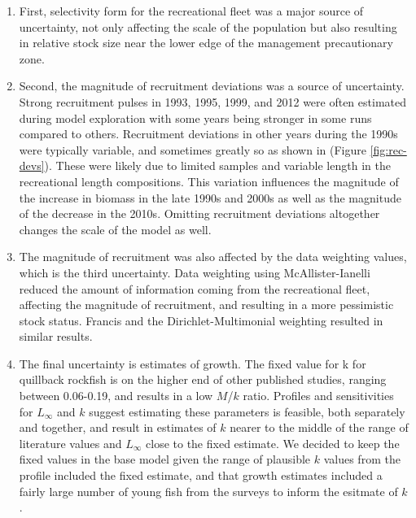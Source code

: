 \documentclass[11pt,
  english,
  a4paper,
]{article}
\begin{document}
\begin{enumerate}

  \item First, selectivity form for the recreational fleet was a major source of uncertainty, not only affecting the scale of the population but also resulting in relative stock size near the lower edge of the management precautionary zone. 
  
  \item Second, the magnitude of recruitment deviations was a source of uncertainty. Strong recruitment pulses in 1993, 1995, 1999, and 2012 were often estimated during model exploration with some years being stronger in some runs compared to others. Recruitment deviations in other years during the 1990s were typically variable, and sometimes greatly so as shown in (Figure \ref{fig:rec-devs}). These were likely due to limited samples and variable length in the recreational length compositions. This variation influences the magnitude of the increase in biomass in the late 1990s and  2000s as well as the magnitude of the decrease in the 2010s. Omitting recruitment deviations altogether changes the scale of the model as well. 
  
  \item The magnitude of recruitment was also affected by the data weighting values, which is the third uncertainty. Data weighting using McAllister-Ianelli reduced the amount of information coming from the recreational fleet, affecting the magnitude of recruitment, and resulting in a more pessimistic stock status. Francis and the Dirichlet-Multimonial weighting resulted in similar results. 
  
  \item The final uncertainty is estimates of growth. The fixed value for k for quillback rockfish is on the higher end of other published studies, ranging between 0.06-0.19, and results in a low $M$/$k$ ratio. Profiles and sensitivities for $L_{\infty}$ and $k$ suggest estimating these parameters is feasible, both separately and together, and result in estimates of $k$ nearer to the middle of the range of literature values and $L_{\infty}$ close to the fixed estimate. We decided to keep the fixed values in the base model given the range of plausible $k$ values from the profile included the fixed estimate, and that growth estimates included a fairly large number of young fish from the surveys to inform the esitmate of $k$.  
  
\end{enumerate}
\end{document}
